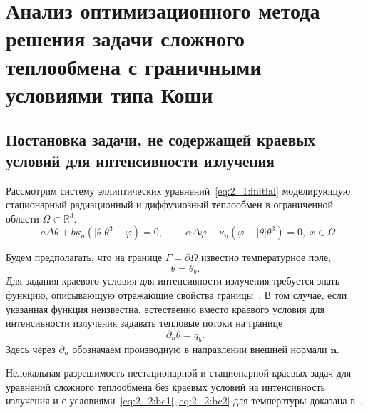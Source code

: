 \section{Анализ оптимизационного метода решения
задачи сложного теплообмена с граничными условиями типа
Коши}\label{sec:ch2/sec2}

\subsection{Постановка задачи, не содержащей краевых условий для интенсивности излучения}\label{subsec:ch2/sec2/subsec1}
Рассмотрим систему эллиптических уравнений~\eqref{eq:2_1:initial}
моделирующую стационарный радиационный и диффузиозный теплообмен в
ограниченной области $\Omega \subset \mathbb{R}^3$.
\begin{equation}
    \label{eq:2_2:eq1}
    - a\Delta\theta + b\kappa_a(|\theta|\theta^3- \varphi)=0, \quad
    -\alpha \Delta \varphi
    + \kappa_a(\varphi-|\theta|\theta^3)=0,\; x\in\Omega.
\end{equation}

Будем предполагать, что на границе $\Gamma = \partial \Omega$ известно температурное поле,
\begin{equation}
    \label{eq:2_2:bc1} \theta = \theta_b.
\end{equation}
Для задания краевого условия для интенсивности излучения
требуется знать функцию, описывающую отражающие свойства границы~\cite{JVM-14}.
В том случае, если указанная функция неизвестна, естественно вместо
краевого условия для интенсивности излучения задавать тепловые потоки на границе
\begin{equation}
    \label{eq:2_2:bc2}
    \partial_n\theta = q_b.
\end{equation}
Здесь через $\partial_n$ обозначаем производную в направлении
внешней нормали $\mathbf n$.

Нелокальная разрешимость нестационарной и
стационарной краевых задач для уравнений сложного теплообмена
без краевых условий на интенсивность излучения и
с условиями~\eqref{eq:2_2:bc1},\eqref{eq:2_2:bc2}
для температуры доказана в~\cite{Chebotarev2019Problem,CMMP20}.

